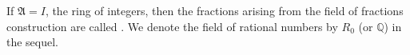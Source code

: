 If $\mathfrak{A} = I$, the ring of integers, then the fractions arising from the field of fractions construction are called . We denote the field of rational numbers by $R_0$ (or $\mathbb{Q}$) in the sequel.
